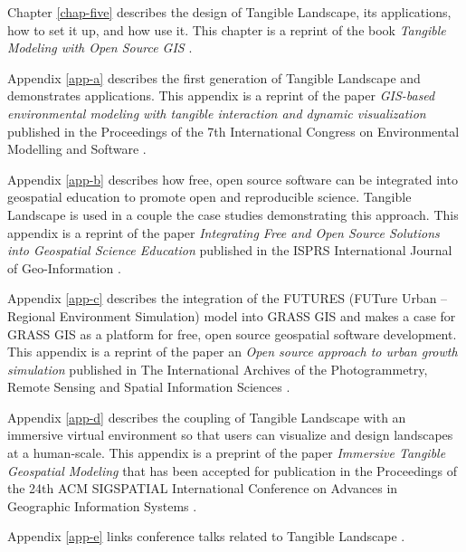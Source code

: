 Chapter \ref{chap-five} describes the design of Tangible Landscape, 
its applications, how to set it up, and how use it.
This chapter is a reprint of the book
\emph{Tangible Modeling with Open Source GIS}
\cite{Petrasova2015}.

Appendix \ref{app-a} 
describes the first generation of Tangible Landscape
and demonstrates applications.
This appendix is a reprint of the paper
\emph{GIS-based environmental modeling with tangible interaction and dynamic visualization}
published in the 
Proceedings of the 7th International Congress on Environmental Modelling and Software
 \cite{Petrasova2014}. 

Appendix \ref{app-b}
describes 
how free, open source software can be integrated into 
geospatial education
to promote open and reproducible science. 
Tangible Landscape is used in a couple the case studies 
demonstrating this approach.
This appendix is a reprint of the paper
\emph{Integrating Free and Open Source Solutions into Geospatial Science Education}
published in the
ISPRS International Journal of Geo-Information
\cite{Petras2015}.

Appendix \ref{app-c}
describes the integration of 
the
FUTURES  
(FUTure Urban -- Regional Environment Simulation)
model
into GRASS GIS 
and makes a case for 
GRASS GIS as a platform for 
free, open source geospatial software development. 
This appendix is a reprint of the paper
an \emph{Open source approach to urban growth simulation}
published in
The International Archives of the Photogrammetry, Remote Sensing and Spatial Information Sciences
\cite{Petrasova2016}.

Appendix \ref{app-d}
describes the coupling of Tangible Landscape with an immersive virtual environment 
so that users can visualize and design landscapes at a human-scale. 
This appendix is a preprint 
of the paper
\emph{Immersive Tangible Geospatial Modeling}
that has been accepted for publication
in the Proceedings of the 24th ACM SIGSPATIAL 
International Conference on Advances in Geographic Information Systems
\cite{Tabrizian2016}.

Appendix \ref{app-e}
links conference talks 
related to Tangible Landscape
\cite{Harmon2014a,Harmon2016tei,Harmon2016d,Harmon2016e,Harmon2016f,Harmon2016g,Harmon2016h}.
%

